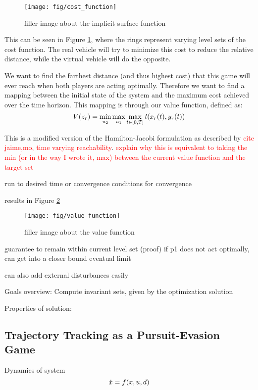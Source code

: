 \begin{figure}
	\centering
	\texttt{[image: fig/cost\_function]}
	\caption{filler image about the implicit surface function}
	\label{fig:cost}
\end{figure} 

 This can be seen in Figure \ref{fig:cost}, where the rings represent varying level sets of the cost function. The real vehicle will try to minimize this cost to reduce the relative distance, while the virtual vehicle will do the opposite.
 
 We want to find the farthest distance (and thus highest cost) that this game will ever reach when both players are acting optimally. Therefore we want to find a mapping between the initial state of the system and the maximum cost achieved over the time horizon. This mapping is through our value function, defined as:
 \begin{equation}
 	V(z_r)= \min_{u_2} \max_{u_1} \max_{t\in [0,T]} l(x_r(t),y_r(t))
 \end{equation} 
 
 This is a modified version of the Hamilton-Jacobi formulation as described by \textcolor{red}{cite jaime,mo, time varying reachability}. \textcolor{red}{explain why this is equivalent to taking the min (or in the way I wrote it, max) between the current value function and the target set}
 
 run to desired time or convergence
 conditions for convergence
 
 results in Figure \ref{fig:value}
 
 
 \begin{figure}
 	\centering
 	\texttt{[image: fig/value\_function]}
 	\caption{filler image about the value function}
 	\label{fig:value}
 \end{figure} 
 guarantee to remain within current level set (proof)
 if p1 does not act optimally, can get into a closer bound
 eventual limit
 
 can also add external disturbances easily
 
 Goals overview: Compute invariant sets, given by the optimization solution
 
 Properties of solution: 
 
 \subsection{Trajectory Tracking as a Pursuit-Evasion Game}
 Dynamics of system
 \begin{equation}
 \dot{x} = f(x, u, d)
 \end{equation}
 
